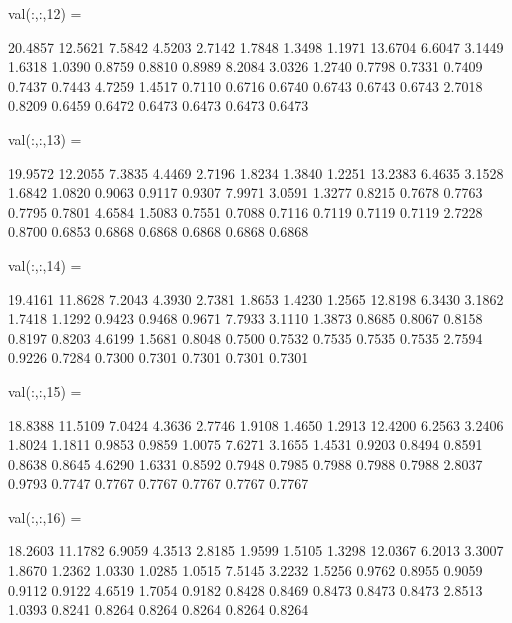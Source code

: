 \documentclass[a4paper,12pt]{ctexart}
\begin{document}
\begin{footnotesize}
val(:,:,12) =

   20.4857   12.5621    7.5842    4.5203    2.7142    1.7848    1.3498    1.1971
   13.6704    6.6047    3.1449    1.6318    1.0390    0.8759    0.8810    0.8989
    8.2084    3.0326    1.2740    0.7798    0.7331    0.7409    0.7437    0.7443
    4.7259    1.4517    0.7110    0.6716    0.6740    0.6743    0.6743    0.6743
    2.7018    0.8209    0.6459    0.6472    0.6473    0.6473    0.6473    0.6473


val(:,:,13) =

   19.9572   12.2055    7.3835    4.4469    2.7196    1.8234    1.3840    1.2251
   13.2383    6.4635    3.1528    1.6842    1.0820    0.9063    0.9117    0.9307
    7.9971    3.0591    1.3277    0.8215    0.7678    0.7763    0.7795    0.7801
    4.6584    1.5083    0.7551    0.7088    0.7116    0.7119    0.7119    0.7119
    2.7228    0.8700    0.6853    0.6868    0.6868    0.6868    0.6868    0.6868


val(:,:,14) =

   19.4161   11.8628    7.2043    4.3930    2.7381    1.8653    1.4230    1.2565
   12.8198    6.3430    3.1862    1.7418    1.1292    0.9423    0.9468    0.9671
    7.7933    3.1110    1.3873    0.8685    0.8067    0.8158    0.8197    0.8203
    4.6199    1.5681    0.8048    0.7500    0.7532    0.7535    0.7535    0.7535
    2.7594    0.9226    0.7284    0.7300    0.7301    0.7301    0.7301    0.7301


val(:,:,15) =

   18.8388   11.5109    7.0424    4.3636    2.7746    1.9108    1.4650    1.2913
   12.4200    6.2563    3.2406    1.8024    1.1811    0.9853    0.9859    1.0075
    7.6271    3.1655    1.4531    0.9203    0.8494    0.8591    0.8638    0.8645
    4.6290    1.6331    0.8592    0.7948    0.7985    0.7988    0.7988    0.7988
    2.8037    0.9793    0.7747    0.7767    0.7767    0.7767    0.7767    0.7767


val(:,:,16) =

   18.2603   11.1782    6.9059    4.3513    2.8185    1.9599    1.5105    1.3298
   12.0367    6.2013    3.3007    1.8670    1.2362    1.0330    1.0285    1.0515
    7.5145    3.2232    1.5256    0.9762    0.8955    0.9059    0.9112    0.9122
    4.6519    1.7054    0.9182    0.8428    0.8469    0.8473    0.8473    0.8473
    2.8513    1.0393    0.8241    0.8264    0.8264    0.8264    0.8264    0.8264

\end{footnotesize}

 
\end{document}
